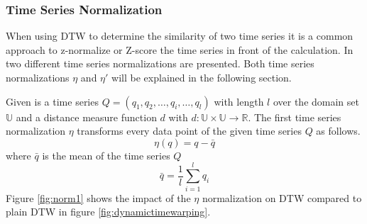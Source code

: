 \subsubsection{Time Series Normalization} \label{time_series_normalization}
When using DTW to determine the similarity of two time series it is a common approach to z-normalize or Z-score the time
series in front of the calculation. In \cite{das1998rule} two different time series normalizations are presented. Both
time series normalizations $\eta$ and $\eta '$ will be explained in the following section.

Given is a time series $Q = (q_1, q_2, \dots, q_i, \dots, q_l)$ with length $l$ over the domain set $\mathbb{U}$ and a
distance measure function $d$ with $d: \mathbb{U} \times \mathbb{U} \to \mathbb{R}$. The first time series normalization
$\eta$ transforms every data
point of the given time series $Q$ as follows.
\begin{equation}
    \eta (q) = q -\bar{q}
\end{equation}
where $\bar{q}$ is the mean of the time series $Q$
\begin{equation}
    \bar{q} = \frac{1}{l} \sum \limits_{i=1}^{l} q_i
\end{equation}
Figure \ref{fig:norm1} shows the impact of the $\eta$ normalization on DTW compared to plain DTW in figure
\ref{fig:dynamictimewarping}.

